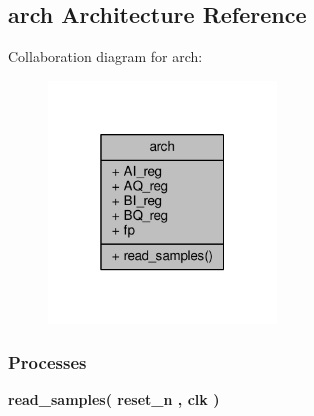 \subsection{arch Architecture Reference}
\label{classadc__data__sim_1_1arch}


Collaboration diagram for arch\+:\nopagebreak
\begin{figure}[H]
\begin{center}
\leavevmode
\includegraphics[width=172pt]{df/de0/classadc__data__sim_1_1arch__coll__graph}
\end{center}
\end{figure}
\subsubsection*{Processes}
 \begin{DoxyCompactItemize}
\item 
{\bf read\+\_\+samples}{\bfseries  ( {\bfseries {\bfseries {\bf reset\+\_\+n}} \textcolor{vhdlchar}{ }} , {\bfseries {\bfseries {\bf clk}} \textcolor{vhdlchar}{ }} )}
\end{DoxyCompactItemize}
